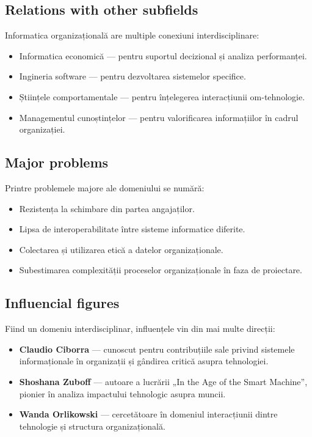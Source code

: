 \documentclass[12pt, letterpaper]{article}
\begin{document}
\subsection*{Relations with other subfields}
Informatica organizațională are multiple conexiuni interdisciplinare:
\begin{itemize}
    \item Informatica economică — pentru suportul decizional și analiza performanței.
    \item Ingineria software — pentru dezvoltarea sistemelor specifice.
    \item Științele comportamentale — pentru înțelegerea interacțiunii om-tehnologie.
    \item Managementul cunoștințelor — pentru valorificarea informațiilor în cadrul organizației.
\end{itemize}

\subsection*{Major problems}
Printre problemele majore ale domeniului se numără:
\begin{itemize}
    \item Rezistența la schimbare din partea angajaților.
    \item Lipsa de interoperabilitate între sisteme informatice diferite.
    \item Colectarea și utilizarea etică a datelor organizaționale.
    \item Subestimarea complexității proceselor organizaționale în faza de proiectare.
\end{itemize}

\subsection*{Influencial figures}
Fiind un domeniu interdisciplinar, influențele vin din mai multe direcții:
\begin{itemize}
    \item \textbf{Claudio Ciborra} — cunoscut pentru contribuțiile sale privind sistemele informaționale în organizații și gândirea critică asupra tehnologiei.
    \item \textbf{Shoshana Zuboff} — autoare a lucrării „In the Age of the Smart Machine”, pionier în analiza impactului tehnologic asupra muncii.
    \item \textbf{Wanda Orlikowski} — cercetătoare în domeniul interacțiunii dintre tehnologie și structura organizațională.
\end{itemize}
\end{document}
